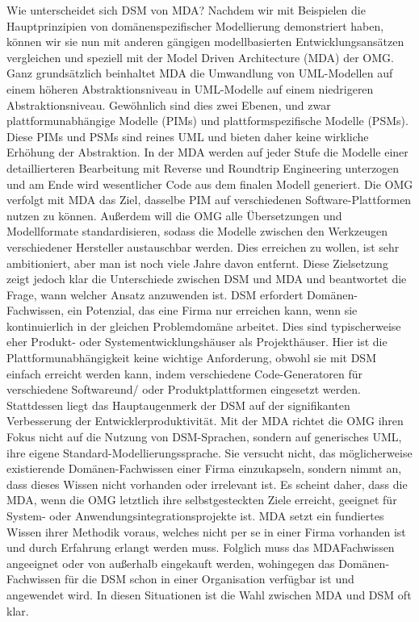 \documentclass[11pt,english,ngerman, headsepline]{scrreprt}
\begin{document}
Wie unterscheidet sich DSM von MDA?
Nachdem wir mit Beispielen die Hauptprinzipien von domänenspezifischer
Modellierung demonstriert haben, können wir
sie nun mit anderen gängigen modellbasierten Entwicklungsansätzen
vergleichen und speziell mit der Model Driven Architecture
(MDA) der OMG. Ganz grundsätzlich beinhaltet MDA
die Umwandlung von UML-Modellen auf einem höheren Abstraktionsniveau
in UML-Modelle auf einem niedrigeren Abstraktionsniveau.
Gewöhnlich sind dies zwei Ebenen, und zwar
plattformunabhängige Modelle (PIMs) und plattformspezifische
Modelle (PSMs). Diese PIMs und PSMs sind reines UML
und bieten daher keine wirkliche Erhöhung der Abstraktion.
In der MDA werden auf jeder Stufe die Modelle einer detaillierteren
Bearbeitung mit Reverse und Roundtrip Engineering
unterzogen und am Ende wird wesentlicher Code aus dem finalen
Modell generiert. Die OMG verfolgt mit MDA das Ziel,
dasselbe PIM auf verschiedenen Software-Plattformen nutzen
zu können. Außerdem will die OMG alle Übersetzungen und
Modellformate standardisieren, sodass die Modelle zwischen
den Werkzeugen verschiedener Hersteller austauschbar werden.
Dies erreichen zu wollen, ist sehr ambitioniert, aber man
ist noch viele Jahre davon entfernt. Diese Zielsetzung zeigt jedoch
klar die Unterschiede zwischen DSM und MDA und beantwortet
die Frage, wann welcher Ansatz anzuwenden ist.
DSM erfordert Domänen-Fachwissen, ein Potenzial, das eine
Firma nur erreichen kann, wenn sie kontinuierlich in der gleichen
Problemdomäne arbeitet. Dies sind typischerweise eher
Produkt- oder Systementwicklungshäuser als Projekthäuser.
Hier ist die Plattformunabhängigkeit keine wichtige Anforderung, obwohl sie mit DSM einfach erreicht werden kann, indem
verschiedene Code-Generatoren für verschiedene Softwareund/
oder Produktplattformen eingesetzt werden. Stattdessen
liegt das Hauptaugenmerk der DSM auf der signifikanten Verbesserung
der Entwicklerproduktivität.
Mit der MDA richtet die OMG ihren Fokus nicht auf die Nutzung
von DSM-Sprachen, sondern auf generisches UML, ihre
eigene Standard-Modellierungssprache. Sie versucht nicht, das
möglicherweise existierende Domänen-Fachwissen einer Firma
einzukapseln, sondern nimmt an, dass dieses Wissen nicht
vorhanden oder irrelevant ist. Es scheint daher, dass die MDA,
wenn die OMG letztlich ihre selbstgesteckten Ziele erreicht, geeignet
für System- oder Anwendungsintegrationsprojekte ist.
MDA setzt ein fundiertes Wissen ihrer Methodik voraus,
welches nicht per se in einer Firma vorhanden ist und durch
Erfahrung erlangt werden muss. Folglich muss das MDAFachwissen
angeeignet oder von außerhalb eingekauft werden,
wohingegen das Domänen-Fachwissen für die DSM schon in
einer Organisation verfügbar ist und angewendet wird. In diesen
Situationen ist die Wahl zwischen MDA und DSM oft klar.
 \cite{dsmUhrenArtikel}
 
\end{document}
